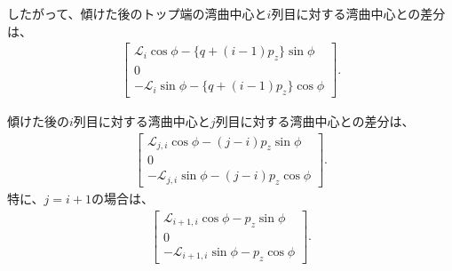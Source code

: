 したがって、傾けた後のトップ端の湾曲中心と$i$列目に対する湾曲中心との差分は、
\begin{align}
  \label{eq:afterPhidimpleCenterDistance}
  \left[
  \begin{array}{c}
    \mathcal L_i\cos\phi-\{q+(i-1)p_z\}\sin\phi\\
    0\\
    -\mathcal L_i\sin\phi-\{q+(i-1)p_z\}\cos\phi
  \end{array}
  \right].
\end{align}
\begin{hosoku}
傾けた後の$i$列目に対する湾曲中心と$j$列目に対する湾曲中心との差分は、
\begin{align*}
  \left[
  \begin{array}{c}
    \mathcal L_{j,i}\cos\phi-(j-i)p_z\sin\phi\\
    0\\
    -\mathcal L_{j,i}\sin\phi-(j-i)p_z\cos\phi
  \end{array}
  \right].
\end{align*}
特に、$j = i+1$の場合は、
\begin{align*}
  \left[
  \begin{array}{c}
    \mathcal L_{i+1,i}\cos\phi-p_z\sin\phi\\
    0\\
    -\mathcal L_{i+1,i}\sin\phi-p_z\cos\phi
  \end{array}
  \right].
\end{align*}
\end{hosoku}

